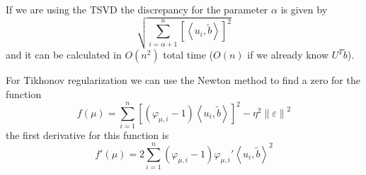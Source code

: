 \documentclass[a4paper,10pt]{article}
\theoremstyle{plain}
\theoremstyle{definition}
\theoremstyle{remark}
\newcommand{\pa}[1]{\left(#1\right)}
\newcommand{\ang}[1]{\left<#1\right>}
\newcommand{\bra}[1]{\left[#1\right]}
\newcommand{\norm}[1]{\left\|#1\right\|}
\begin{document}
If we are using the TSVD the discrepancy for the parameter $\alpha$ is
given by
\[ \sqrt{\sum _{i=\alpha +1} ^n \bra{ \ang{ u_i, \tilde b} } ^2 } \]
and it can be calculated in $O(n^2)$ total time ($O(n)$ if we already
know $U^T \tilde b$).

For Tikhonov regularization we can use the Newton method to find a
zero for the function
\[ f(\mu) = \sum _{i=1} ^n \bra{ \pa{ \varphi _{\mu,i} -1} \ang{ u_i,
    \tilde b} } ^2 - \eta ^2 \norm{\varepsilon} ^2 \] 
the first derivative for this function is
\[ f'(\mu) = 2 \sum _{i=1} ^n \pa{ \varphi _{\mu,i} -1} \varphi
_{\mu,i} ' \ang{ u_i, \tilde b} ^2 \]



\newpage


\end{document}

